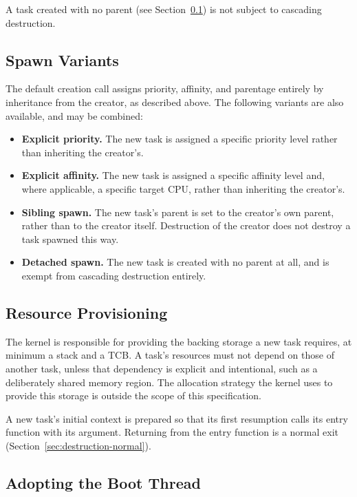 \documentclass[11pt]{article}
\begin{document}
A task created with no parent (see Section~\ref{sec:creation-variants}) is not subject to cascading destruction.

\subsection{Spawn Variants}
\label{sec:creation-variants}

The default creation call assigns priority, affinity, and parentage entirely by inheritance from the creator, as described above.
The following variants are also available, and may be combined:

\begin{itemize}
	\item \textbf{Explicit priority.} The new task is assigned a specific priority level rather than inheriting the creator's.
	\item \textbf{Explicit affinity.} The new task is assigned a specific affinity level and, where applicable, a specific target CPU, rather than inheriting the creator's.
	\item \textbf{Sibling spawn.} The new task's parent is set to the creator's own parent, rather than to the creator itself. Destruction of the creator does not destroy a task spawned this way.
	\item \textbf{Detached spawn.} The new task is created with no parent at all, and is exempt from cascading destruction entirely.
\end{itemize}

\subsection{Resource Provisioning}

The kernel is responsible for providing the backing storage a new task requires, at minimum a stack and a TCB.
A task's resources must not depend on those of another task, unless that dependency is explicit and intentional, such as a deliberately shared memory region.
The allocation strategy the kernel uses to provide this storage is outside the scope of this specification.

A new task's initial context is prepared so that its first resumption calls its entry function with its argument. Returning from the entry function is a normal exit (Section~\ref{sec:destruction-normal}).

\subsection{Adopting the Boot Thread}
\label{sec:boot-task}
\end{document}
